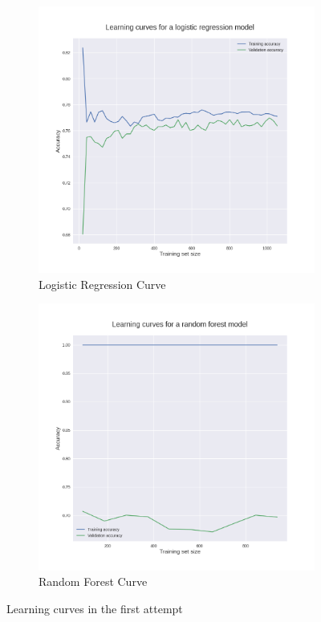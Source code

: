 \documentclass[10pt, conference]{IEEEtran}
\begin{document}
\begin{figure}[t]
    \centering
    \begin{subfigure}[b]{.5\linewidth}
        \centering
        \includegraphics[width=\linewidth]{resources/learning_curve_basic_features_log_regr.png}
        \caption{Logistic Regression Curve}
        \label{fig:learning-curves-first-attempt-randfor}
    \end{subfigure}%
    \begin{subfigure}[b]{.5\linewidth}
        \centering
        \includegraphics[width=\linewidth]{resources/learning_curve_basic_features_rand_for.png}
        \caption{Random Forest Curve}
        \label{fig:learning-curves-first-attempt-logreg}
    \end{subfigure}
    \caption{Learning curves in the first attempt}
    \label{fig:learning-curves-first-attempt}
\end{figure}
\end{document}
